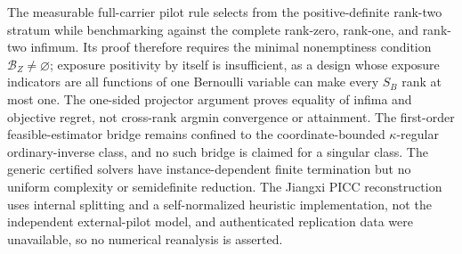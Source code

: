 The measurable full-carrier pilot rule selects from the positive-definite rank-two stratum while benchmarking against the complete rank-zero, rank-one, and rank-two infimum.  Its proof therefore requires the minimal nonemptiness condition \(\mathcal B_Z\ne\varnothing\); exposure positivity by itself is insufficient, as a design whose exposure indicators are all functions of one Bernoulli variable can make every \(S_B\) rank at most one.  The one-sided projector argument proves equality of infima and objective regret, not cross-rank argmin convergence or attainment.  The first-order feasible-estimator bridge remains confined to the coordinate-bounded \(\kappa\)-regular ordinary-inverse class, and no such bridge is claimed for a singular class.  The generic certified solvers have instance-dependent finite termination but no uniform complexity or semidefinite reduction.  The Jiangxi PICC reconstruction uses internal splitting and a self-normalized heuristic implementation, not the independent external-pilot model, and authenticated replication data were unavailable, so no numerical reanalysis is asserted.